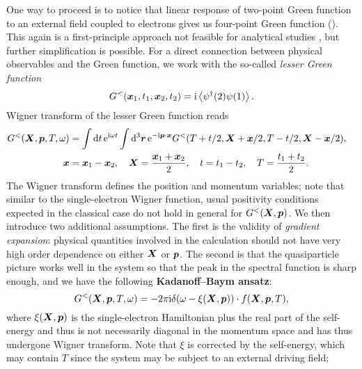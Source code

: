 \documentclass[hyperref, a4paper]{article}
\newcommand*{\ii}{\mathrm{i}}
\newcommand*{\ee}{\mathrm{e}}
\newcommand*{\concept}[1]{{\textbf{#1}}}
\begin{document}
One way to proceed is to notice that 
linear response of two-point Green function 
to an external field coupled to electrons 
gives us four-point Green function
().
This again is a first-principle approach 
not feasible for analytical studies
\cite{attaccalite2011real},
but further simplification is possible.
For a direct connection between physical observables and the Green function,
we work with the so-called \emph{lesser Green function}
\begin{equation}
    G^<(\vb*{x}_1, t_1, \vb*{x}_2, t_2) = \ii \expval{\psi^\dagger(2) \psi(1)}.
\end{equation}
Wigner transform of the lesser Green function reads
\begin{equation}
    \begin{aligned}
        G^<(\vb*{X}, \vb*{p}, T, \omega) &= 
        \int \dd{t} \ee^{\ii \omega t}
        \int \dd[3]{\vb*{r}} \ee^{- \ii \vb*{p} \cdot \vb*{x}} 
        G^<(T + t / 2, \vb*{X} + \vb*{x} / 2, T - t/2, \vb*{X} - \vb*{x} / 2), \quad \\
        \vb*{x} &= \vb*{x}_1 - \vb*{x}_2, \quad 
        \vb*{X} = \frac{\vb*{x}_1 + \vb*{x}_2}{2}, \quad 
        t = t_1 - t_2, \quad T = \frac{t_1 + t_2}{2}.
    \end{aligned}
    \label{eq:g-to-f}
\end{equation}
The Wigner transform
defines the position and momentum variables;
note that similar to the single-electron Wigner function,
usual positivity conditions expected in the classical case 
do not hold in general for $G^<(\vb*{X}, \vb*{p})$.
We then introduce two additional assumptions.
The first is the validity of \emph{gradient expansion}:
physical quantities involved in the calculation 
should not have very high order dependence on either $\vb*{X}$ or $\vb*{p}$.
The second is that the quasiparticle picture works well in the system 
so that the peak in the spectral function is sharp enough, and we have 
the following \concept{Kadanoff–Baym ansatz}:
\begin{equation}
    G^<(\vb*{X}, \vb*{p}, T, \omega) = - 2 \pi \ii \delta(\omega - \xi(\vb*{X}, \vb*{p})) \cdot 
    f(\vb*{X}, \vb*{p}, T),
    \label{eq:spectral-peak}
\end{equation}
where $\xi(\vb*{X}, \vb*{p})$ is the 
single-electron Hamiltonian plus the real part of the self-energy 
and thus is not necessarily diagonal in the momentum space 
and has thus undergone Wigner transform.
Note that $\xi$ is corrected by the self-energy,
which may contain $T$ since the system may be subject to an external driving field;
\end{document}
